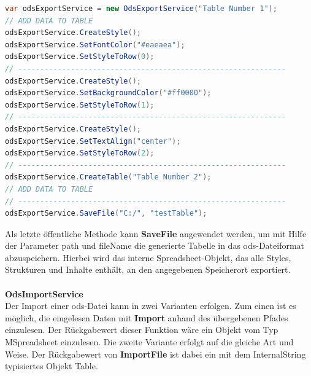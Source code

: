 \newpage
\begin{lstlisting}[caption=Codebeispiel wie drei Zeilen einer Tabelle gestyled werden und eine weitere Tabelle hinzugefügt wird, language=Java]
var odsExportService = new OdsExportService("Table Number 1");
// ADD DATA TO TABLE
odsExportService.CreateStyle();
odsExportService.SetFontColor("#eaeaea");
odsExportService.SetStyleToRow(0);
// -------------------------------------------------------------
odsExportService.CreateStyle();
odsExportService.SetBackgroundColor("#ff0000");
odsExportService.SetStyleToRow(1);
// -------------------------------------------------------------
odsExportService.CreateStyle();
odsExportService.SetTextAlign("center");
odsExportService.SetStyleToRow(2);
// -------------------------------------------------------------
odsExportService.CreateTable("Table Number 2");
// ADD DATA TO TABLE
// -------------------------------------------------------------
odsExportService.SaveFile("C:/", "testTable");
\end{lstlisting}
Als letzte öffentliche Methode kann \textbf{SaveFile} angewendet werden, um mit Hilfe der Parameter {\frqq}path{\flqq} und {\frqq}fileName{\flqq} die generierte Tabelle in das ods-Dateiformat abzuspeichern. Hierbei wird das interne Spreadsheet-Objekt, das alle Styles, Strukturen und Inhalte enthält, an den angegebenen Speicherort exportiert.\\\\
\textbf{OdsImportService}\\
Der Import einer ods-Datei kann in zwei Varianten erfolgen. Zum einen ist es möglich, die eingelesen Daten mit \textbf{Import} anhand des übergebenen Pfades einzulesen. Der Rückgabewert dieser Funktion wäre ein Objekt vom Typ MSpreadsheet einzulesen. Die zweite Variante erfolgt auf die gleiche Art und Weise. Der Rückgabewert von \textbf{ImportFile} ist dabei ein mit dem InternalString typisiertes Objekt Table.

